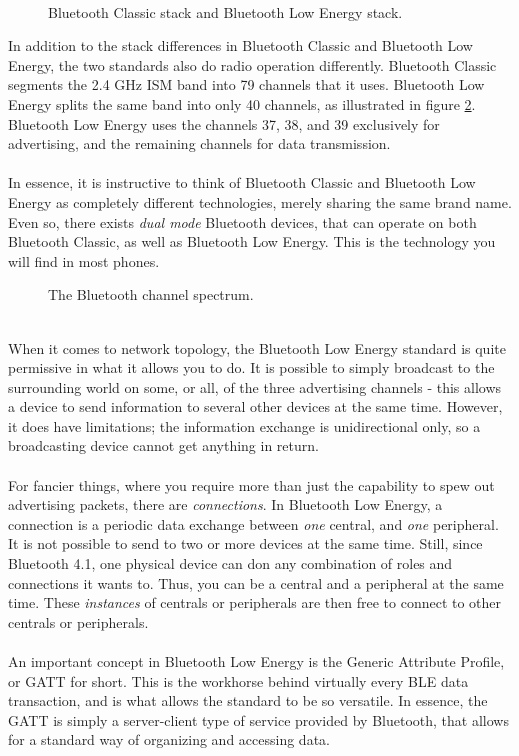 \documentclass[11pt,a4paper]{article}
\begin{document}
\\
\begin{figure}[hbt]
\centering

\caption{Bluetooth Classic stack and Bluetooth Low Energy stack.}
\label{fig::bluetooth_stack_differences}
\end{figure}
In addition to the stack differences in Bluetooth Classic and Bluetooth Low Energy, the two standards also do radio operation differently. Bluetooth Classic segments the 2.4 GHz ISM band into 79 channels that it uses. Bluetooth Low Energy splits the same band into only 40 channels, as illustrated in figure \ref{fig::bluetooth_spectrum}. Bluetooth Low Energy uses the channels 37, 38, and 39 exclusively for advertising, and the remaining channels for data transmission.\\
\\
In essence, it is instructive to think of Bluetooth Classic and Bluetooth Low Energy as completely different technologies, merely sharing the same brand name. Even so, there exists \textit{dual mode} Bluetooth devices, that can operate on both Bluetooth Classic, as well as Bluetooth Low Energy. This is the technology you will find in most phones.
\begin{figure}[hb]
\centering
\resizebox{\linewidth}{!}{

}
\caption{The Bluetooth channel spectrum.}
\label{fig::bluetooth_spectrum}
\end{figure}\\
When it comes to network topology, the Bluetooth Low Energy standard is quite permissive in what it allows you to do. It is possible to simply broadcast to the surrounding world on some, or all, of the three advertising channels - this allows a device to send information to several other devices at the same time. However, it does have limitations; the information exchange is unidirectional only, so a broadcasting device cannot get anything in return.\\
\\
For fancier things, where you require more than just the capability to spew out advertising packets, there are \textit{connections}. In Bluetooth Low Energy, a connection is a periodic data exchange between \textit{one} central, and \textit{one} peripheral. It is not possible to send to two or more devices at the same time. Still, since Bluetooth 4.1, one physical device can don any combination of roles and connections it wants to. Thus, you can be a central and a peripheral at the same time. These \textit{instances} of centrals or peripherals are then free to connect to other centrals or peripherals.\\
\\
An important concept in Bluetooth Low Energy is the Generic Attribute Profile, or GATT for short. This is the workhorse behind virtually every BLE data transaction, and is what allows the standard to be so versatile. In essence, the GATT is simply a server-client type of service provided by Bluetooth, that allows for a standard way of organizing and accessing data.
\end{document}
